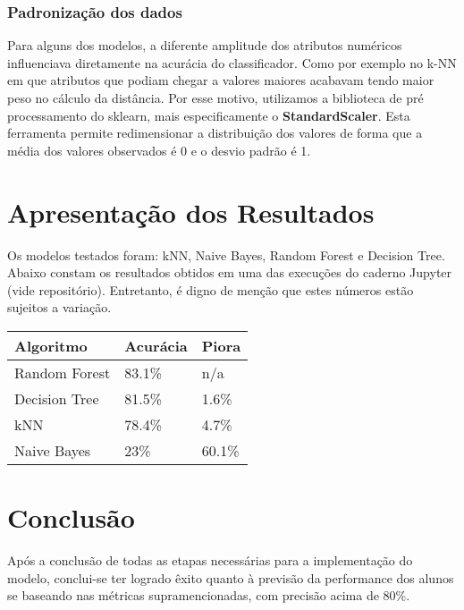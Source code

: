 \documentclass[]{IEEEphot}
\begin{document}
\subsubsection{Padronização dos dados}

Para alguns dos modelos, a diferente amplitude dos atributos numéricos influenciava diretamente na acurácia do classificador. Como por exemplo no k-NN em que atributos que podiam chegar a valores maiores acabavam tendo maior peso no cálculo da distância. Por esse motivo, utilizamos a biblioteca de pré processamento do sklearn, mais especificamente o \textbf{StandardScaler}. Esta ferramenta permite redimensionar a distribuição dos valores de forma que a média dos valores observados é 0 e o desvio padrão é 1.

\section{Apresentação dos Resultados}

Os modelos testados foram: kNN, Naive Bayes, Random Forest e Decision Tree. Abaixo constam os resultados obtidos em uma das execuções do caderno Jupyter (vide repositório). Entretanto, é digno de menção que estes números estão sujeitos a variação.


\vspace{0.5cm}

\begin{tabular}{ |p{3cm}|p{3cm}|p{3cm}|  }
\hline
 \textbf{Algoritmo} & \textbf{Acurácia} & \textbf{Piora}\footnotemark \\
 \hline
 Random Forest & 83.1\% & n/a \\
 Decision Tree & 81.5\% & 1.6\% \\
 kNN & 78.4\% & 4.7\% \\
 Naive Bayes & 23\% & 60.1\% \\
 \hline
\end{tabular}


\section{Conclusão}

Após a conclusão de todas as etapas necessárias para a implementação do modelo, conclui-se ter logrado êxito quanto à previsão da performance dos alunos se baseando nas métricas supramencionadas, com precisão acima de 80\%.
\end{document}

